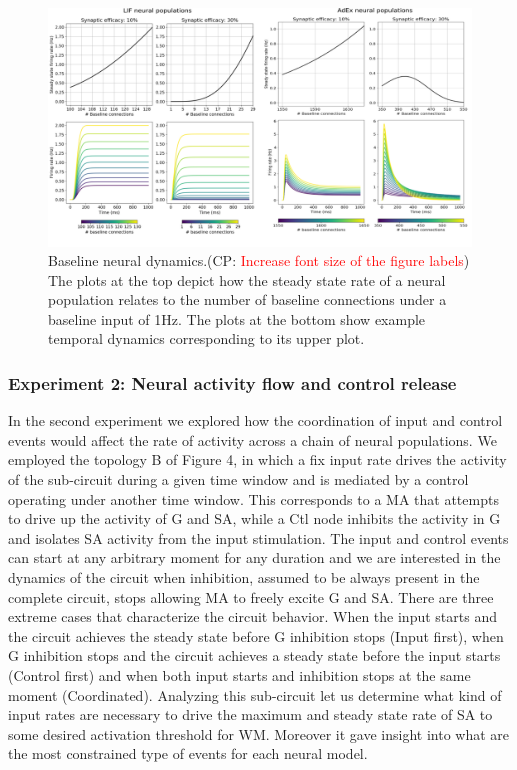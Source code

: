 \documentclass[10pt]{article}
\newcommand{\noteCP}[1]{(CP: \textcolor{red}{#1})}
\begin{document}
\begin{figure}[h!]
  \begin{center}
    \includegraphics[width=1.00\columnwidth]{figures/experiment_001/experiment_001}
    \caption{Baseline neural dynamics.\noteCP{Increase font size of the figure labels}
      The plots at the top depict how the steady state rate of a neural population relates to the number of baseline connections under a baseline input of 1Hz.
      The plots at the bottom show example temporal dynamics corresponding to its upper plot.}
    \label{674368}

  \end{center}
\end{figure}

\subsubsection{Experiment 2: Neural activity flow and control
  release}\label{experiment-2-neural-activity-flow-and-control-release}

In the second experiment we explored how the coordination of input and control events would affect the rate of activity across a chain of neural populations.
We employed the topology B of Figure 4, in which a fix input rate drives the activity of the sub-circuit during a given time window and is mediated by a control operating under another time window.
This corresponds to a MA that attempts to drive up the activity of G and SA, while a Ctl node inhibits the activity in G and isolates SA activity from the input stimulation.
The input and control events can start at any arbitrary moment for any duration and we are interested in the dynamics of the circuit when inhibition, assumed  to be always present in the complete circuit, stops allowing MA to freely excite G and SA.
There are three extreme cases that characterize the circuit behavior.
When the input starts and the circuit achieves the steady state before G inhibition stops (Input first), when G inhibition stops and the circuit achieves a steady state before the input starts (Control first) and when both input starts and inhibition stops at the same moment (Coordinated).
Analyzing this sub-circuit let us determine what kind of input rates are necessary to drive the maximum and steady state rate of SA to some desired activation threshold for WM.
Moreover it gave insight into what are the most constrained type of events for each neural model.
\end{document}
